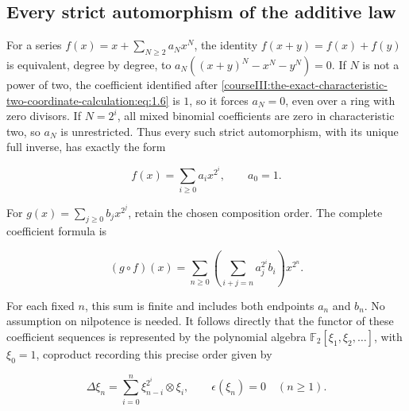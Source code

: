 \subsection{Every strict automorphism of the additive law}
\label{courseIII:the-exact-characteristic-two-coordinate-calculation:formal-two-additive-series}

\label{courseIII:the-exact-characteristic-two-coordinate-calculation:section-3}\label{courseIII:formal-char2:3}

For a series \(f(x)=x+\sum_{N\geq2}a_Nx^N\), the identity \(f(x+y)=f(x)+f(y)\) is equivalent, degree by degree, to
\(a_N((x+y)^N-x^N-y^N)=0\).
If \(N\) is not a power of two, the coefficient identified after \eqref{courseIII:the-exact-characteristic-two-coordinate-calculation:eq:1.6} is \(1\), so it forces \(a_N=0\), even over a ring with zero divisors. If \(N=2^i\), all mixed binomial coefficients are zero in characteristic two, so \(a_N\) is unrestricted. Thus every such strict automorphism, with its unique full inverse, has exactly the form

\begin{equation}
f(x)=\sum_{i\geq0}a_i x^{2^i},\qquad a_0=1.
 \label{courseIII:the-exact-characteristic-two-coordinate-calculation:eq:3.1}
\end{equation}

For \(g(x)=\sum_{j\geq0}b_jx^{2^j}\), retain the chosen composition order. The complete coefficient formula is

\begin{equation}
(g\circ f)(x)
   =\sum_{n\geq0}\left(\sum_{i+j=n}a_j^{2^i}b_i\right)x^{2^n}.
 \label{courseIII:the-exact-characteristic-two-coordinate-calculation:eq:3.2}
\end{equation}

For each fixed \(n\), this sum is finite and includes both endpoints \(a_n\) and \(b_n\). No assumption on nilpotence is needed. It follows directly that the functor of these coefficient sequences is represented by the polynomial algebra \(\mathbb F_2[\xi_1,\xi_2,\ldots]\), with \(\xi_0=1\), coproduct recording this precise order given by

\begin{equation}
\Delta\xi_n=\sum_{i=0}^{n}\xi_{n-i}^{2^i}\otimes\xi_i,
 \qquad\epsilon(\xi_n)=0\quad(n\geq1).
 \label{courseIII:the-exact-characteristic-two-coordinate-calculation:eq:3.3}
\end{equation}

